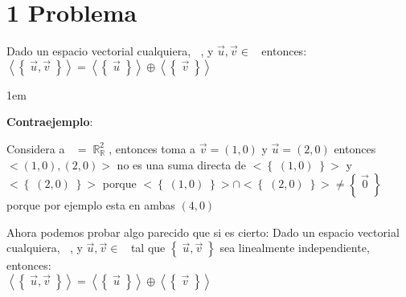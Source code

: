 \documentclass[12pt, fleqn]{article}                             %
\newenvironment{SmallIndentation}[1][0.75em]                    %
        {\begin{adjustwidth}{#1}{}\begin{footnotesize}}             %
        {\end{footnotesize}\end{adjustwidth}}                       %
\theoremstyle{break}                                            %
\DeclareMathOperator \Reals        {\mathbb{R}}                 %
\DeclareMathOperator \GenericField {\mathbb{F}}                 %
\DeclareMathOperator \VectorSet    {\mathbb{V}}                 %
\DeclareMathOperator \VectorSpace  {\VectorSet_{\GenericField}} %
\newcommand{\Set}[1]    {\left\{ \; #1 \; \right\}}             %
\newcommand{\Wrap}[1]    {\left( #1 \right)}                    %
\newcommand{\Generate}[1]{\left\langle #1 \right\rangle}        %
\begin{document}
\restoregeometry                                                    %
\nopagecolor                                                        %




\tableofcontents{}
\label{sec:Index}

\clearpage




\clearpage
\section{1 Problema}

    Dado un espacio vectorial cualquiera, $\VectorSpace$, y $\vec u, \vec v \in \VectorSpace$
    entonces:\\
    $\Generate{\Set{\vec u, \vec v}} = \Generate{\Set{\vec u}} \oplus \Generate{\Set{\vec v}}$

    \begin{SmallIndentation}[1em]
        \textbf{Contraejemplo}:
        
        Considera a $\VectorSpace = \Reals^2_{\Reals}$, entonces toma a $\vec v = (1, 0)$ y $\vec u = (2, 0)$
        entonces $<{(1, 0), (2, 0)}>$ no es una suma directa de $<\Set{(1, 0)}>$ y $<\Set{(2, 0)}>$ porque 
        $<\Set{(1, 0)}> \cap <\Set{(2, 0)}> \neq \Set{\vec 0}$ porque por ejemplo esta en ambas $(4, 0)$

    \end{SmallIndentation}


    Ahora podemos probar algo parecido que si es cierto:
    Dado un espacio vectorial cualquiera, $\VectorSpace$, y $\vec u, \vec v \in \VectorSpace$ tal que
    $\Set{\vec u, \vec v}$ sea linealmente independiente, entonces:\\
    $\Generate{\Set{\vec u, \vec v}} = \Generate{\Set{\vec u}} \oplus \Generate{\Set{\vec v}}$
\end{document}
